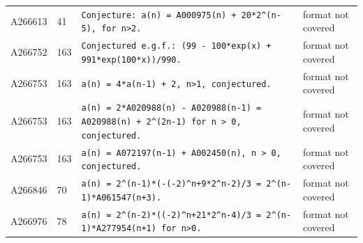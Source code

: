 \documentclass[11pt]{article}
\theoremstyle{definition}
\theoremstyle{remark}
\begin{document}
{\begin{longtable}{p{1.3cm}p{0.7cm}p{10cm}p{3cm}}
A266613 & 41 & \texttt{Conjecture: \allowbreak{}a(n)\allowbreak{} \allowbreak{}=\allowbreak{} \allowbreak{}A000975(n)\allowbreak{} \allowbreak{}+\allowbreak{} \allowbreak{}20*\allowbreak{}2\^{}(n-\allowbreak{}5)\allowbreak{},\allowbreak{} \allowbreak{}for \allowbreak{}n>2.} & format not covered \\
A266752 & 163 & \texttt{Conjectured \allowbreak{}e.g.f.: \allowbreak{}(99 \allowbreak{}-\allowbreak{} \allowbreak{}100*\allowbreak{}exp(x)\allowbreak{} \allowbreak{}+\allowbreak{} \allowbreak{}991*\allowbreak{}exp(100*\allowbreak{}x)\allowbreak{})\allowbreak{}/\allowbreak{}990.} & format not covered \\
A266753 & 163 & \texttt{a(n)\allowbreak{} \allowbreak{}=\allowbreak{} \allowbreak{}4*\allowbreak{}a(n-\allowbreak{}1)\allowbreak{} \allowbreak{}+\allowbreak{} \allowbreak{}2,\allowbreak{} \allowbreak{}n>1,\allowbreak{} \allowbreak{}conjectured.} & format not covered \\
A266753 & 163 & \texttt{a(n)\allowbreak{} \allowbreak{}=\allowbreak{} \allowbreak{}2*\allowbreak{}A020988(n)\allowbreak{} \allowbreak{}-\allowbreak{} \allowbreak{}A020988(n-\allowbreak{}1)\allowbreak{} \allowbreak{}=\allowbreak{} \allowbreak{}A020988(n)\allowbreak{} \allowbreak{}+\allowbreak{} \allowbreak{}2\^{}(2n-\allowbreak{}1)\allowbreak{} \allowbreak{}for \allowbreak{}n \allowbreak{}> \allowbreak{}0,\allowbreak{} \allowbreak{}conjectured.} & format not covered \\
A266753 & 163 & \texttt{a(n)\allowbreak{} \allowbreak{}=\allowbreak{} \allowbreak{}A072197(n-\allowbreak{}1)\allowbreak{} \allowbreak{}+\allowbreak{} \allowbreak{}A002450(n)\allowbreak{},\allowbreak{} \allowbreak{}n \allowbreak{}> \allowbreak{}0,\allowbreak{} \allowbreak{}conjectured.} & format not covered \\
A266846 & 70 & \texttt{a(n)\allowbreak{} \allowbreak{}=\allowbreak{} \allowbreak{}2\^{}(n-\allowbreak{}1)\allowbreak{}*\allowbreak{}(-\allowbreak{}(-\allowbreak{}2)\allowbreak{}\^{}n+\allowbreak{}9*\allowbreak{}2\^{}n-\allowbreak{}2)\allowbreak{}/\allowbreak{}3 \allowbreak{}=\allowbreak{} \allowbreak{}2\^{}(n-\allowbreak{}1)\allowbreak{}*\allowbreak{}A061547(n+\allowbreak{}3)\allowbreak{}.} & format not covered \\
A266976 & 78 & \texttt{a(n)\allowbreak{} \allowbreak{}=\allowbreak{} \allowbreak{}2\^{}(n-\allowbreak{}2)\allowbreak{}*\allowbreak{}((-\allowbreak{}2)\allowbreak{}\^{}n+\allowbreak{}21*\allowbreak{}2\^{}n-\allowbreak{}4)\allowbreak{}/\allowbreak{}3 \allowbreak{}=\allowbreak{} \allowbreak{}2\^{}(n-\allowbreak{}1)\allowbreak{}*\allowbreak{}A277954(n+\allowbreak{}1)\allowbreak{} \allowbreak{}for \allowbreak{}n>0.} & format not covered \\

\end{longtable}}
\end{document}
